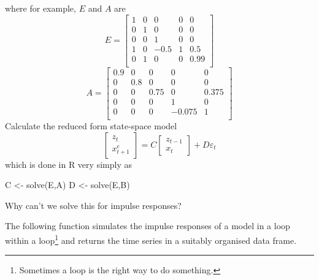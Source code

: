 \documentclass[
  letterpaper,
]{book}
\newenvironment{Shaded}{\begin{snugshade}}{\end{snugshade}}
\newcommand{\FunctionTok}[1]{\textcolor[rgb]{0.28,0.35,0.67}{#1}}
\newcommand{\NormalTok}[1]{\textcolor[rgb]{0.00,0.23,0.31}{#1}}
\newcommand{\OtherTok}[1]{\textcolor[rgb]{0.00,0.23,0.31}{#1}}
\begin{document}
where for example, \(E\) and \(A\) are \begin{equation}
  E = \left[\begin{matrix}1 &0 &0 &0 &0 \\0 &1 &0 &0 &0 \\0 &0 &1 &0 &0 \\1 &0 &-0.5 &1 &0.5 \\0 &1 &0 &0 &0.99 \\\end{matrix}\right] 
\end{equation} \begin{equation}  
  A = \left[\begin{matrix}0.9 &0 &0 &0 &0 \\0 &0.8 &0 &0 &0 \\0 &0 &0.75 &0 &0.375 \\0 &0 &0 &1 &0 \\0 &0 &0 &-0.075 &1 \\\end{matrix}\right] 
\end{equation} Calculate the reduced form state-space model
\begin{equation}
\begin{bmatrix} z_t \\ x_{t+1}^e \end{bmatrix} = C \begin{bmatrix} z_{t-1} \\ x_t \end{bmatrix} + D \varepsilon_t  
\end{equation} which is done in R very simply as

\begin{Shaded}
\begin{Highlighting}[]
\NormalTok{C }\OtherTok{\textless{}{-}} \FunctionTok{solve}\NormalTok{(E,A)}
\NormalTok{D }\OtherTok{\textless{}{-}} \FunctionTok{solve}\NormalTok{(E,B)}
\end{Highlighting}
\end{Shaded}

Why can't we solve this for impulse responses?

The following function simulates the impulse responses of a model in a
loop within a loop\footnote{Sometimes a loop is the right way to do
  something.} and returns the time series in a suitably organised data
frame.
\end{document}
